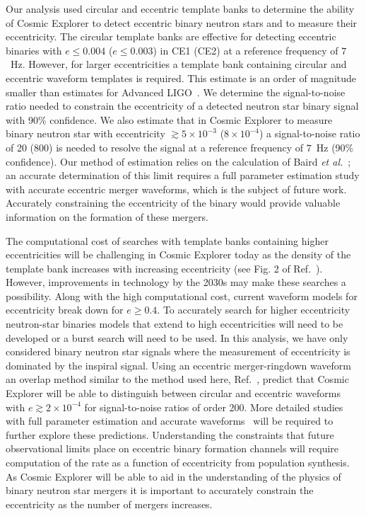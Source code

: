 Our analysis used circular and eccentric template banks to determine the ability of Cosmic Explorer to detect eccentric binary neutron stars and to measure their eccentricity. The circular template banks are effective for detecting eccentric binaries with $e \leq 0.004$ ($e \leq 0.003$) in CE1 (CE2) at a reference frequency of $7$~Hz. However, for larger eccentricities a template bank containing circular and eccentric waveform templates is required. This estimate is an order of magnitude smaller than estimates for Advanced LIGO~\cite{Brown:2009ng, Huerta:2013qb}. We determine the signal-to-noise ratio needed to constrain the eccentricity of a detected neutron star binary signal with 90\% confidence. We also estimate that in Cosmic Explorer to measure binary neutron star with eccentricity $\gtrsim 5\times10^{-3}$ ($8\times 10^{-4}$) a signal-to-noise ratio of 20 (800) is needed to resolve the signal at a reference frequency of $7$~Hz (90\% confidence). Our method of estimation relies on the calculation of Baird \textit{et al.}~\cite{Baird:2012cu}; an accurate determination of this limit requires a full parameter estimation study with accurate eccentric merger waveforms, which is the subject of future work. Accurately constraining the eccentricity of the binary would provide valuable information on the formation of these mergers.

The computational cost of searches with template banks containing higher eccentricities will be challenging in Cosmic Explorer today as the density of the template bank increases with increasing eccentricity (see Fig. 2 of Ref.~\cite{Nitz:2019spj}). However, improvements in technology by the 2030s may make these searches a possibility. Along with the high computational cost, current waveform models for eccentricity break down for $e \geq 0.4$. To accurately search for higher eccentricity neutron-star binaries models that extend to high eccentricities will need to be developed or a burst search will need to be used. In this analysis, we have only considered binary neutron star signals where the measurement of eccentricity is dominated by the inspiral signal. Using an eccentric merger-ringdown waveform~\cite{Huerta:2014eca} an overlap method similar to the method used here, Ref.~\cite{Lower:2018seu}, predict that Cosmic Explorer will be able to distinguish between circular and eccentric waveforms with $e \gtrsim 2 \times 10^{-4}$ for signal-to-noise ratios of order 200. More detailed studies with full parameter estimation and accurate waveforms~\cite{Tanay:2016zog, Huerta:2016rwp, Cao:2017ndf, Huerta:2017kez, Hinder:2017sxy} will be required to further explore these predictions. Understanding the constraints that future observational limits place on eccentric binary formation channels will require computation of the rate as a function of eccentricity from population synthesis. As Cosmic Explorer will be able to aid in the understanding of the physics of binary neutron star mergers it is important to accurately constrain the eccentricity as the number of mergers increases.

